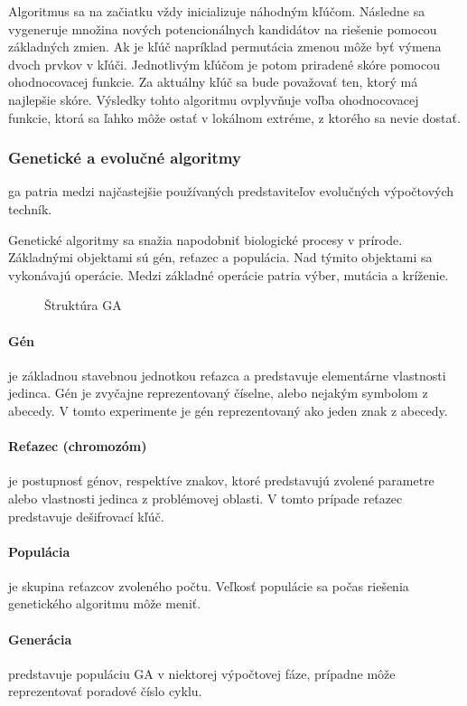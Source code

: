 Algoritmus sa na začiatku vždy inicializuje náhodným kľúčom. Následne sa vygeneruje množina nových potencionálnych kandidátov na riešenie
pomocou základných zmien. Ak je kľúč napríklad permutácia zmenou môže byť výmena dvoch prvkov v kľúči.
Jednotlivým kľúčom je potom priradené skóre pomocou ohodnocovacej funkcie.
Za aktuálny kľúč sa bude považovať ten, ktorý má najlepšie skóre.
Výsledky tohto algoritmu ovplyvňuje voľba ohodnocovacej funkcie, ktorá sa ľahko môže ostať v lokálnom extréme, z ktorého sa nevie dostať.

\subsubsection{Genetické a evolučné algoritmy}
\acrfull{ga} patria medzi najčastejšie používaných predstaviteľov evolučných výpočtových techník.

Genetické algoritmy sa snažia napodobniť biologické procesy v prírode.
Základnými objektami sú gén, reťazec a populácia. Nad týmito objektami sa vykonávajú operácie.
Medzi základné operácie patria výber, mutácia a kríženie.
\begin{figure}[!h]
  \centering
  
  \caption{Štruktúra GA}
  \label{img:ga}
\end{figure}

\paragraph{Gén} je základnou stavebnou jednotkou reťazca a predstavuje elementárne vlastnosti jedinca.
Gén je zvyčajne reprezentovaný číselne, alebo nejakým symbolom z abecedy.
V tomto experimente je gén reprezentovaný ako jeden znak z abecedy.

\paragraph{Reťazec (chromozóm)} je postupnosť génov, respektíve znakov, ktoré predstavujú zvolené parametre alebo vlastnosti jedinca
z problémovej oblasti. V tomto prípade reťazec predstavuje dešifrovací kľúč. 

\paragraph{Populácia} je skupina reťazcov zvoleného počtu. Veľkosť populácie sa počas riešenia genetického algoritmu môže meniť.

\paragraph{Generácia} predstavuje populáciu GA v niektorej výpočtovej fáze, prípadne môže reprezentovať poradové číslo cyklu.

